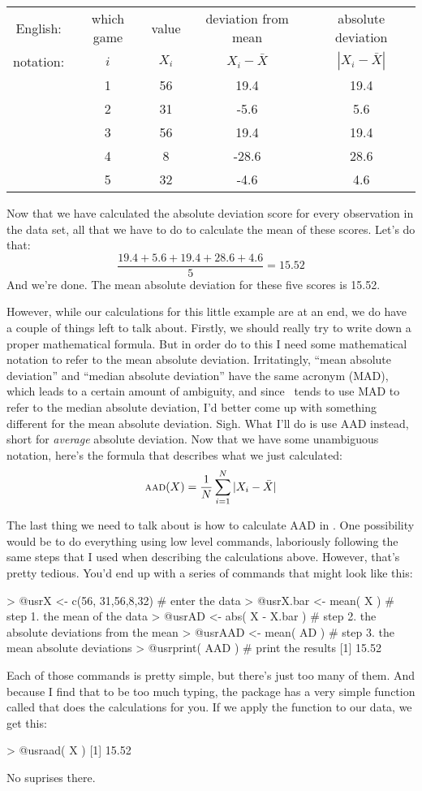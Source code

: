\begin{center}
\begin{tabular}{ccccc} 
English: & which game & value & deviation from mean & absolute deviation \\
notation: & $i$ & $X_i$ & $X_i - \bar{X}$ &  $|X_i - \bar{X}|$ \\ \hline
& 1 & 56 & 19.4  & 19.4\\
& 2 & 31 &  -5.6 & 5.6\\ 
& 3 & 56 & 19.4  & 19.4\\
& 4 & 8 & -28.6  & 28.6\\
& 5 & 32 & -4.6  & 4.6 \\
\end{tabular}
\end{center}

\noindent
Now that we have calculated the absolute deviation score for every observation in the data set, all that we have to do to calculate the mean of these scores. Let's do that:
$$
\frac{19.4 + 5.6 + 19.4 + 28.6 + 4.6}{5} = 15.52
$$
And we're done. The mean absolute deviation for these five scores is 15.52. 

However, while our calculations for this little example are at an end, we do have a couple of things left to talk about. Firstly, we should really try to write down a proper mathematical formula. But in order do to this I need some mathematical notation to refer to the mean absolute deviation. Irritatingly, ``mean absolute deviation'' and ``median absolute deviation'' have the same acronym (MAD), which leads to a certain amount of ambiguity, and since \R\ tends to use MAD to refer to the median absolute deviation, I'd better come up with something different for the mean absolute deviation. Sigh. What I'll do is use AAD instead, short for {\it average} absolute deviation. Now that we have some unambiguous notation, here's the formula that describes what we just calculated:
$$
\mbox{\textsc{aad}}(X) = \frac{1}{N} \sum_{i = 1}^N |X_i - \bar{X}|
$$

The last thing we need to talk about is how to calculate AAD in \R. One possibility would be to do everything using low level commands, laboriously following the same steps that I used when describing the calculations above. However, that's pretty tedious. You'd end up with a series of commands that might look like this:
\begin{rblock1}
> @usr{X <- c(56, 31,56,8,32)}   # enter the data
> @usr{X.bar <- mean( X )}       # step 1. the mean of the data
> @usr{AD <- abs( X - X.bar )}   # step 2. the absolute deviations from the mean
> @usr{AAD <- mean( AD )}        # step 3. the mean absolute deviations
> @usr{print( AAD ) }            # print the results
[1] 15.52
\end{rblock1}
Each of those commands is pretty simple, but there's just too many of them. And because I find that to be too much typing, the  package has a very simple function called  that does the calculations for you. If we apply the  function to our data, we get this:
\begin{rblock1}
> @usr{aad( X )}
[1] 15.52
\end{rblock1}
No suprises there.


